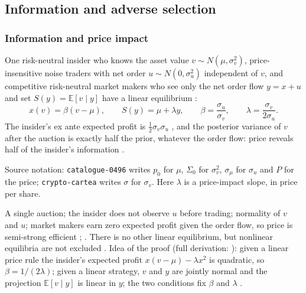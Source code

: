 \subsection{Information and adverse selection}

\subsubsection{Information and price impact}

\begin{qfmodel}\label{mod:kyle-single-auction}
 One risk-neutral insider who knows the asset value $v\sim N(\mu,\sigma_v^2)$, price-insensitive noise traders with net order $u\sim N(0,\sigma_u^2)$ independent of $v$, and competitive risk-neutral market makers who see only the net order flow $y=x+u$ and set $S(y)=\mathbb{E}[v\mid y]$ \citep[chap.~``A Primer on the Microstructure of Financial Markets'', pp.~31--32]{crypto-cartea} have a linear equilibrium \citep[chap.~``Strategic Trader Models I: Informed Traders'', p.~93, eqs.~(4.3)--(4.5)]{catalogue-0496}:
\[ x(v)=\beta(v-\mu), \qquad S(y)=\mu+\lambda y, \qquad \beta=\frac{\sigma_u}{\sigma_v}, \qquad \lambda=\frac{\sigma_v}{2\sigma_u}. \]
The insider's ex ante expected profit is $\tfrac12\sigma_v\sigma_u$ \citep[same chap., p.~97, eq.~(4.17)]{catalogue-0496}, and the posterior variance of $v$ after the auction is exactly half the prior, whatever the order flow: price reveals half of the insider's information \citep[same chap., p.~98, eq.~(4.20)]{catalogue-0496}.

 Source notation: \nolinkurl{catalogue-0496} writes $p_0$ for $\mu$, $\Sigma_0$ for $\sigma_v^2$, $\sigma_\mu$ for $\sigma_u$ and $P$ for the price; \nolinkurl{crypto-cartea} writes $\sigma$ for $\sigma_v$. Here $\lambda$ is a price-impact slope, in price per share.

 A single auction; the insider does not observe $u$ before trading; normality of $v$ and $u$; market makers earn zero expected profit given the order flow, so price is semi-strong efficient \citep[same chap., pp.~91--92]{catalogue-0496}; \citep[chap.~``A Primer on the Microstructure of Financial Markets'', p.~32]{crypto-cartea}. There is no other linear equilibrium, but nonlinear equilibria are not excluded \citep[chap.~``Strategic Trader Models I: Informed Traders'', p.~97]{catalogue-0496}. Idea of the proof (full derivation: ): given a linear price rule the insider's expected profit $x(v-\mu)-\lambda x^2$ is quadratic, so $\beta=1/(2\lambda)$; given a linear strategy, $v$ and $y$ are jointly normal and the projection $\mathbb{E}[v\mid y]$ is linear in $y$; the two conditions fix $\beta$ and $\lambda$ \citep[same chap., pp.~93--96]{catalogue-0496}.


\end{qfmodel}
